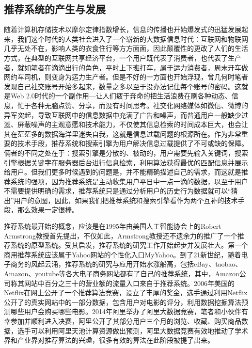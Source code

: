 	\subsection{推荐系统的产生与发展}
	随着计算机存储技术以摩尔定律指数增长，信息的传播也开始爆发式的迅猛发展起来，我们这个时代的人类社会进入了一个崭新的大数据信息时代：互联网和物联网几乎无处不在，影响人类的衣食住行等方方面面，因此颠覆性的更改了人们的生活方式，在典型的互联网共享经济平台，一个用户既代表了消费者，也代表了生产者，就如笔者在滴滴出行的角色，平时上下班打车，属于运力消费者，周末开车做网约车司机，则变身为运力生产者。但是不好的一方面也开始浮现，曾几何时笔者发现自己社交账号开始多起来，数量之多以至于没办法记住每个账号的密码。这就是Web 2.0时代的一个副作用---让人们疲于奔命的把生活浪费在刷各种动态、信息，忙于各种无脑点赞、分享，而没有时间思考。社交化网络媒体如微信、微博的异军突起，导致互联网中的信息数据中充满了广告和噪声，而普通用户一般缺少过滤、屏蔽噪声的主观意愿和技术能力，不仅使其信息检索的时间成本巨大，也会让其在茫茫多的数据海洋里迷失自我，这就是信息过载问题的根源所在\citep{info-overload, info-overload:1}。作为非常重要的技术手段，推荐系统和搜索引擎为用户解决信息过载提供了不可或缺的保障。倆者的不同之处在于：搜索引擎是分散的、被动的，用户需要先输入关键词，搜索引擎根据关键字在服务器后台进行信息检索，利用算法获得最优的匹配信息并展示给用户。但我们更多时候遇到的问题是，并不能精确描述自己的需求，而这就是推荐系统的强项，因为推荐系统是主动收集用户平日中一点一滴的数据，以至于用户不需要提供明确的需求，推荐系统只是通过分析用户的历史行为数据就可以“猜出”用户的意图，因此，如果我们把推荐系统和搜索引擎看作为两个互补的技术手段，那么效果一定很棒。

	推荐系统最开始的概念，应该是在1995年由美国人工智能协会\citep{recmd-history}上的Robert Armstrong教授首先提出，不仅如此，Armstrong教授还不遗余力的推广了一个推荐系统的原型系统。受其启发，推荐系统的研究工作开始起步并发展壮大。第一个商用推荐系统应该属于Yahoo网站的个性化入口MyYahoo。到了21新世纪，随着电子商务的风起云涌，推荐系统的研究与应用开始水涨船高，包括eBay、taobao、Amazon、youtube\citep{recmd-youtube}等各大电子商务网站都有了自己的推荐系统，其中，Amazon公司称其网站中百分之三十的营业额的流量入口来自于推荐系统。2006年美国的Netflix\citep{recmd-netflix}在网上公开了一个推荐算法竞赛，设立了丰厚的奖金，选手通过利用Netflix公开了的真实网站中的一部分数据，包含用户对电影的评分，利用数据挖掘算法预测哪些用户会购买哪些电影。2014年阿里举办了阿里大数据竞赛，笔者和小伙伴有幸参加并顺利进入决赛，阿里公开了其部分用户三个月的浏览、收藏、购买商品数据，选手可以利用阿里天池计算资源做出预测，阿里大数据竞赛有效地推动了学术界和产业界对推荐算法的兴趣，很多有效的算法在此阶段被提了出来。

